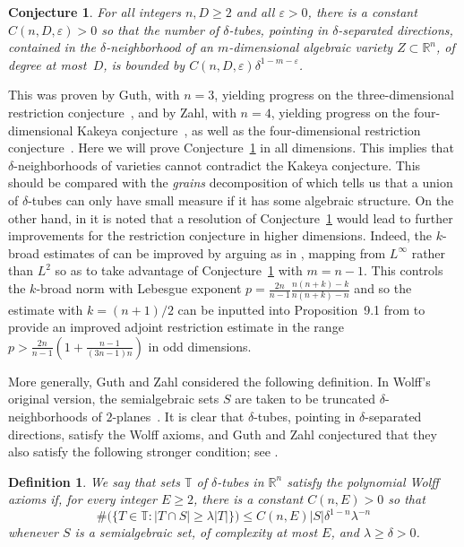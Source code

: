 \documentclass[letterpaper, reqno, 11pt]{amsart}
\newtheorem{defn}{Definition}[section]
\newtheorem{conjecture}{Conjecture}[section]
\theoremstyle{remark}
\numberwithin{equation}{section}
\begin{document}
\begin{conjecture}\label{guth} For all integers $n,D\ge 2$ and all $\varepsilon>0$, there is a constant $C(n,D,\varepsilon)>0$ so that the number of $\delta$-tubes, pointing in $\delta$-separated directions, contained in the $\delta$-neighborhood of an $m$-dimensional algebraic variety  $Z\subset \mathbb{R}^{n}$, of degree at most~$D$, is bounded by $C(n,D,\varepsilon)\delta^{1-m-\varepsilon}$. 
\end{conjecture}
This was proven by Guth,  with $n=3$, yielding progress on the three-dimensional restriction conjecture~\cite{G1, H},  and  by Zahl, with $n=4$, yielding progress on the four-dimensional Kakeya conjecture~\cite{Z}, as well as the four-dimensional restriction conjecture~\cite{D}. Here we will prove Conjecture~\ref{guth} in all dimensions. This implies that $\delta$-neighborhoods of varieties cannot contradict the Kakeya conjecture. This should be compared with the {\it grains} decomposition of \cite{GZ} which tells us that a union of $\delta$-tubes can only have small measure if it has some algebraic structure.
On the other hand, in \cite{G} it is noted that a resolution of Conjecture~\ref{guth} would lead to further improvements for the restriction conjecture in higher dimensions. Indeed, the $k$-broad estimates of \cite{G} can be improved by arguing as in \cite{G1}, mapping from $L^\infty$ rather than $L^2$ so as to take advantage of Conjecture~\ref{guth} with $m=n-1$. This controls the $k$-broad norm with Lebesgue exponent $p=\frac{2n}{n-1}\frac{n(n+k)-k}{n(n+k)-n}$ and so the estimate with $k=(n+1)/2$ can be inputted into Proposition~9.1 from \cite{G} to provide an improved adjoint restriction estimate in the range $p>\frac{2n}{n-1}(1+\frac{n-1}{(3n-1)n})$ in odd dimensions. 

More generally, Guth and Zahl considered the following definition. In Wolff's original version, the semialgebraic sets $S$ are taken to be truncated $\delta$-neighborhoods of $2$-planes~\cite{W}. It is clear that $\delta$-tubes, pointing in $\delta$-separated directions, satisfy the Wolff axioms, and Guth and Zahl conjectured that they also satisfy the following stronger condition; see \cite[pp. 4]{GZ}.
\begin{defn}\label{defnTubeWolffAxioms} 
We say that sets $\mathbb{T}$ of $\delta$-tubes in $\mathbb{R}^n$ satisfy the polynomial Wolff axioms if, for every integer $E\ge 2$, there is a constant $C(n,E)>0$ so that
$$\#\big(\big\{ T \in \mathbb{T} :  |T \cap S| \geq \lambda |T| \big\}\big) \leq C(n,E) |S| \delta^{1-n} \lambda^{-n}$$
whenever $S$ is a semialgebraic set, of complexity at most $E$, and $\lambda\ge \delta>0$.
\end{defn}
\end{document}
